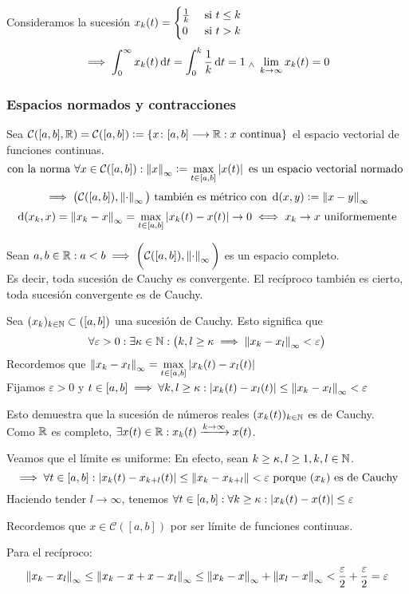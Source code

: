 \begin{ejem} %
	Consideramos la sucesión $x_k(t) = \begin{cases}
			\frac{1}{k} & \text{ si } t\leq k \\
			0           & \text{ si } t>k
		\end{cases}$
	\[\implies \int_{0}^{\infty} x_k(t) \odif{t} = \int_{0}^{k} \frac{1}{k} \odif{t} = 1 \we \lim_{k\to\infty} x_k(t) = 0\]
\end{ejem}
\subsubsection{Espacios normados y contracciones}
Sea $\mathcal{C}([a,b], \mathbb{R})=\mathcal{C}([a,b]) \vcentcolon= \left\{x \colon [a,b] \longrightarrow \mathbb{R} : x\text{ continua}\right\}$ el espacio vectorial de funciones continuas.
\[\text{con la norma }\forall x \in \mathcal{C}([a,b]) : \left\Vert x\right\Vert_{\infty} \vcentcolon= \max_{t\in [a,b]} \left|x(t)\right| \text{ es un espacio vectorial normado }\]
\[\implies \big(\mathcal{C}([a,b]), \left\Vert\cdot\right\Vert_\infty\big) \text{ también es métrico con } \operatorname{d}(x,y)\vcentcolon=\left\Vert x-y\right\Vert_\infty\]
\[\operatorname{d}(x_k, x) = \left\Vert x_k-x\right\Vert_\infty=\max_{t\in [a,b]} \left|x_k(t)-x(t)\right| \rightarrow0 \iff x_k\to x \text{ uniformemente}\]
\begin{teo}
	Sean $a, b \in \mathbb{R} : a<b \implies \displaystyle \bigg(\mathcal{C}([a,b]), \left\Vert\cdot\right\Vert_\infty\bigg)$ es un espacio completo.\\Es decir, toda sucesión de Cauchy es convergente. El recíproco también es cierto, toda sucesión convergente es de Cauchy.
	\begin{dem}
		Sea $(x_k)_{k\in \mathbb{N}}\subset \mathcal([a,b])$ una sucesión de Cauchy. Esto significa que
		\[\forall \varepsilon > 0 : \exists \kappa \in \mathbb{N} : \big(k, l\geq \kappa \implies \left\Vert x_k-x_l\right\Vert_\infty <\varepsilon\big) \]
		Recordemos que $\displaystyle \left\Vert x_k-x_l\right\Vert_\infty = \max_{t\in[a,b]}\left|x_k(t)-x_l(t)\right|$\\
		Fijamos $\varepsilon > 0$ y $\displaystyle t\in [a,b] \implies \forall k, l \geq \kappa : \left|x_k(t) - x_l(t)\right| \leq \left\Vert x_k-x_l\right\Vert_\infty < \varepsilon$

		Esto demuestra que la sucesión de números reales $(x_k(t))_{k\in\mathbb{N}}$ es de Cauchy. \\
		Como $\mathbb{R}$ es completo, $\exists x(t) \in \mathbb{R} : x_k(t) \xrightarrow{k\to\infty} x(t)$.

		Veamos que el límite es uniforme: En efecto, sean $k\geq \kappa, l \geq 1, k, l \in \mathbb{N}$.
		\[\implies \forall t \in [a,b] : \left|x_k(t)-x_{k+l}(t)\right| \leq \left\Vert x_k-x_{k+l}\right\Vert < \varepsilon \text{ porque $(x_k)$ es de Cauchy}\]
		Haciendo tender $l\to\infty$, tenemos $\displaystyle \forall t \in [a,b] : \forall k \geq \kappa : \left|x_k(t)-x(t)\right|\leq \varepsilon$

		Recordemos que $x\in\mathcal{C}([a,b])$ por ser límite de funciones continuas.

		Para el recíproco:
		\[\left\Vert x_k-x_l\right\Vert_\infty \leq \left\Vert x_k-x+x-x_l\right\Vert_\infty \leq \left\Vert x_k-x\right\Vert_\infty + \left\Vert x_l-x\right\Vert_\infty < \frac{\varepsilon}{2} + \frac{\varepsilon}{2} = \varepsilon\]
	\end{dem}
\end{teo}
